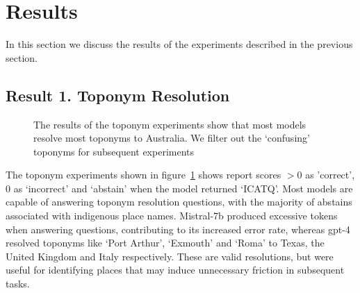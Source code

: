 \section{Results}
\label{section:results}

In this section we discuss the results of the experiments described in the previous section.


\subsection{Result 1. Toponym Resolution}

\begin{figure}
    \centering
    
    \caption{The results of the toponym experiments show that most models resolve most toponyms to Australia. We filter out the `confusing' toponyms for subsequent experiments}
    \label{fig:toponym}
\end{figure}

The toponym experiments shown in figure~\ref{fig:toponym} shows report scores $>0$ as 'correct', $0$ as `incorrect' and `abstain' when the model returned `ICATQ'. 
Most models are capable of answering toponym resolution questions, with the majority of abstains associated with indigenous place names. 
Mistral-7b produced excessive tokens when answering questions, contributing to its increased error rate, whereas gpt-4 resolved toponyms like `Port Arthur', `Exmouth' and `Roma' to Texas, the United Kingdom and Italy respectively.
These are valid resolutions, but were useful for identifying places that may induce unnecessary friction in subsequent tasks.





